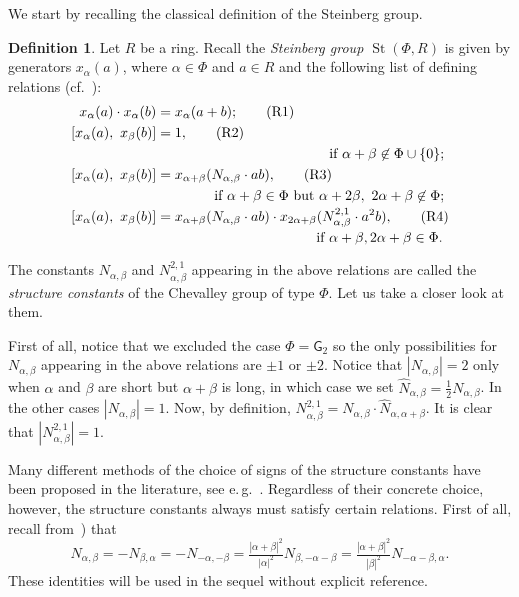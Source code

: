 \documentclass[oneside, 11pt]{amsart}
\numberwithin{equation}{section}
\theoremstyle{definition}
\newtheorem{df}[lemma]{Definition} \Crefname{df}{Definition}{Definitions}
\theoremstyle{remark}
\DeclareMathOperator\St{St}
\begin{document}
We start by recalling the classical definition of the Steinberg group.
\begin{df} \label{def:Steinberg}
Let $R$ be a ring. Recall the {\it Steinberg group $\St(\Phi, R)$} is given by generators $x_\alpha(a)$, where $\alpha \in \Phi$ and $a \in R$ and the following list of defining relations (cf.~\cite{Re75}):
\begin{align}
 x_\alpha(a) \cdot x_\alpha(b)    &= x_\alpha(a+b); \tag{R1} \label{R1} \\
 [x_\alpha(a),\ x_\beta(b)] &= 1, \tag{R2} \label{R2} \\ 
 \multispan2{\hfil if $\alpha + \beta \not\in\Phi \cup \{0\};$} \nonumber \\
 [x_\alpha(a),\ x_\beta(b)] &= x_{\alpha + \beta}(N_{\alpha,\beta} \cdot ab), \tag{R3} \label{R3} \\
 \multispan2{\hfill if $\alpha+\beta\in\Phi$ but $\alpha+2\beta,\ 2\alpha+\beta\not\in\Phi;$} \nonumber \\
 [x_\alpha(a),\ x_\beta(b)] &= x_{\alpha + \beta}(N_{\alpha,\beta} \cdot ab) \cdot x_{2\alpha+\beta}(N_{\alpha,\beta}^{2,1} \cdot a^2b), \tag{R4} \label{R4} \\ \multispan2{ \hfill if $\alpha+\beta,2\alpha+\beta\in\Phi$.} \nonumber  \end{align}
\end{df}
The constants $N_{\alpha,\beta}$ and $N_{\alpha,\beta}^{2,1}$ appearing in the above relations are called the {\it structure constants} of the Chevalley group of type $\Phi$. Let us take a closer look at them.

First of all, notice that we excluded the case $\Phi=\mathsf{G}_2$ so the only possibilities for $N_{\alpha, \beta}$ appearing in the above relations are $\pm 1$ or $\pm 2$.
Notice that $|N_{\alpha,\beta}| = 2$ only when $\alpha$ and $\beta$ are short but $\alpha+\beta$ is long, in which case we set $\widehat{N}_{\alpha, \beta} = \frac{1}{2} N_{\alpha, \beta}$.
In the other cases $|N_{\alpha, \beta}| = 1$.
Now, by definition, $N_{\alpha,\beta}^{2,1} = N_{\alpha,\beta} \cdot \widehat{N}_{\alpha, \alpha+\beta}$.
It is clear that $|N_{\alpha,\beta}^{2,1}|=1$.

Many different methods of the choice of signs of the structure constants have been proposed in the literature, see e.\,g.~\cite{VP}. 
Regardless of their concrete choice, however, the structure constants always must satisfy certain relations. First of all, recall from~\cite[\S~14]{VP}) that
\begin{equation} \label{eq:sc-ids-sl} N_{\alpha, \beta} = -N_{\beta,\alpha} = - N_{-\alpha, -\beta} = \tfrac{|\alpha+\beta|^2}{|\alpha|^2} N_{\beta, -\alpha-\beta} = \tfrac{|\alpha+\beta|^2}{|\beta|^2} N_{-\alpha-\beta, \alpha}. \end{equation}
These identities will be used in the sequel without explicit reference. 
\end{document}
